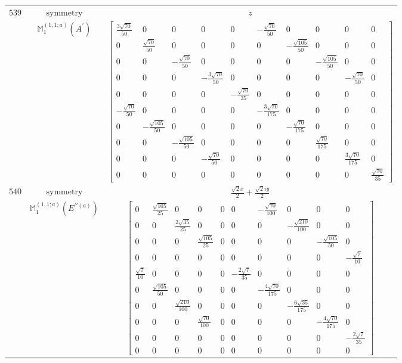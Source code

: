\documentclass[fleqn,8pt,landscape]{jsarticle}
\begin{document}
\begin{longtable}{ccc}
$ 539 $ & $ \text{symmetry} $ & $ z $ \\
$  $ & $ \mathbb{M}_{1}^{(1,1;a)}(A^{\prime}) $ & $ \begin{bmatrix} \frac{3 \sqrt{70}}{50} & 0 & 0 & 0 & 0 & - \frac{\sqrt{70}}{50} & 0 & 0 & 0 & 0 \\ 0 & \frac{\sqrt{70}}{50} & 0 & 0 & 0 & 0 & - \frac{\sqrt{105}}{50} & 0 & 0 & 0 \\ 0 & 0 & - \frac{\sqrt{70}}{50} & 0 & 0 & 0 & 0 & - \frac{\sqrt{105}}{50} & 0 & 0 \\ 0 & 0 & 0 & - \frac{3 \sqrt{70}}{50} & 0 & 0 & 0 & 0 & - \frac{\sqrt{70}}{50} & 0 \\ 0 & 0 & 0 & 0 & - \frac{\sqrt{70}}{35} & 0 & 0 & 0 & 0 & 0 \\ - \frac{\sqrt{70}}{50} & 0 & 0 & 0 & 0 & - \frac{3 \sqrt{70}}{175} & 0 & 0 & 0 & 0 \\ 0 & - \frac{\sqrt{105}}{50} & 0 & 0 & 0 & 0 & - \frac{\sqrt{70}}{175} & 0 & 0 & 0 \\ 0 & 0 & - \frac{\sqrt{105}}{50} & 0 & 0 & 0 & 0 & \frac{\sqrt{70}}{175} & 0 & 0 \\ 0 & 0 & 0 & - \frac{\sqrt{70}}{50} & 0 & 0 & 0 & 0 & \frac{3 \sqrt{70}}{175} & 0 \\ 0 & 0 & 0 & 0 & 0 & 0 & 0 & 0 & 0 & \frac{\sqrt{70}}{35} \end{bmatrix} $ \\ \hline
$ 540 $ & $ \text{symmetry} $ & $ \frac{\sqrt{2} x}{2} + \frac{\sqrt{2} i y}{2} $ \\
$  $ & $ \mathbb{M}_{1}^{(1,1;a)}(E^{\prime\prime(a)}) $ & $ \begin{bmatrix} 0 & \frac{\sqrt{105}}{25} & 0 & 0 & 0 & 0 & - \frac{\sqrt{70}}{100} & 0 & 0 & 0 \\ 0 & 0 & \frac{2 \sqrt{35}}{25} & 0 & 0 & 0 & 0 & - \frac{\sqrt{210}}{100} & 0 & 0 \\ 0 & 0 & 0 & \frac{\sqrt{105}}{25} & 0 & 0 & 0 & 0 & - \frac{\sqrt{105}}{50} & 0 \\ 0 & 0 & 0 & 0 & 0 & 0 & 0 & 0 & 0 & - \frac{\sqrt{7}}{10} \\ \frac{\sqrt{7}}{10} & 0 & 0 & 0 & 0 & - \frac{2 \sqrt{7}}{35} & 0 & 0 & 0 & 0 \\ 0 & \frac{\sqrt{105}}{50} & 0 & 0 & 0 & 0 & - \frac{4 \sqrt{70}}{175} & 0 & 0 & 0 \\ 0 & 0 & \frac{\sqrt{210}}{100} & 0 & 0 & 0 & 0 & - \frac{6 \sqrt{35}}{175} & 0 & 0 \\ 0 & 0 & 0 & \frac{\sqrt{70}}{100} & 0 & 0 & 0 & 0 & - \frac{4 \sqrt{70}}{175} & 0 \\ 0 & 0 & 0 & 0 & 0 & 0 & 0 & 0 & 0 & - \frac{2 \sqrt{7}}{35} \\ 0 & 0 & 0 & 0 & 0 & 0 & 0 & 0 & 0 & 0 \end{bmatrix} $ \\ \hline

\end{longtable}
\end{document}

